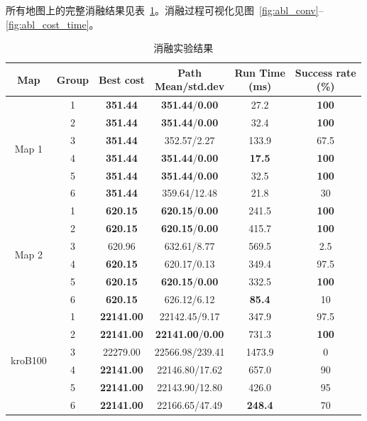 \documentclass[lettersize,journal]{IEEEtran}
\begin{document}
所有地图上的完整消融结果见表~\textcolor{blue}{\ref{tab:ablation}}。消融过程可视化见图~\textcolor{blue}{\ref{fig:abl_conv}}--\textcolor{blue}{\ref{fig:abl_cost_time}}。

\begin{table}[!t]
\caption{消融实验结果}
\label{tab:ablation}
\centering
\scriptsize
\setlength{\tabcolsep}{2.5pt}
\begin{tabular}{cccccc}
\toprule
Map & Group & Best cost & \makecell{Path\\Mean/std.dev} & \makecell{Run Time\\(ms)} & \makecell{Success rate\\(\%)} \\
\midrule
 \multirow{6}{*}{Map 1} & 1 & \textbf{351.44} & \textbf{351.44}/\textbf{0.00} & 27.2 & \textbf{100} \\
   & 2 & \textbf{351.44} & \textbf{351.44}/\textbf{0.00} & 32.4 & \textbf{100} \\
   & 3 & \textbf{351.44} & 352.57/2.27 & 133.9 & 67.5 \\
   & 4 & \textbf{351.44} & \textbf{351.44}/\textbf{0.00} & \textbf{17.5} & \textbf{100} \\
   & 5 & \textbf{351.44} & \textbf{351.44}/\textbf{0.00} & 32.5 & \textbf{100} \\
   & 6 & \textbf{351.44} & 359.64/12.48 & 21.8 & 30 \\
\midrule
 \multirow{6}{*}{Map 2} & 1 & \textbf{620.15} & \textbf{620.15}/\textbf{0.00} & 241.5 & \textbf{100} \\
   & 2 & \textbf{620.15} & \textbf{620.15}/\textbf{0.00} & 415.7 & \textbf{100} \\
   & 3 & 620.96 & 632.61/8.77 & 569.5 & 2.5 \\
   & 4 & \textbf{620.15} & 620.17/0.13 & 349.4 & 97.5 \\
   & 5 & \textbf{620.15} & \textbf{620.15}/\textbf{0.00} & 332.5 & \textbf{100} \\
   & 6 & \textbf{620.15} & 626.12/6.12 & \textbf{85.4} & 10 \\
\midrule
 \multirow{6}{*}{kroB100} & 1 & \textbf{22141.00} & 22142.45/9.17 & 347.9 & 97.5 \\
   & 2 & \textbf{22141.00} & \textbf{22141.00}/\textbf{0.00} & 731.3 & \textbf{100} \\
   & 3 & 22279.00 & 22566.98/239.41 & 1473.9 & 0 \\
   & 4 & \textbf{22141.00} & 22146.80/17.62 & 657.0 & 90 \\
   & 5 & \textbf{22141.00} & 22143.90/12.80 & 426.0 & 95 \\
   & 6 & \textbf{22141.00} & 22166.65/47.49 & \textbf{248.4} & 70 \\
\bottomrule
\end{tabular}
\end{table}
\end{document}
